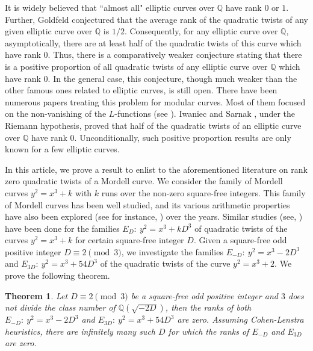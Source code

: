 \documentclass[12pt, 14paper,reqno]{amsart}
\theoremstyle{plain}
\newtheorem{thm}{Theorem}[section]
\theoremstyle{proof}
\numberwithin{equation}{section}
\begin{document}
It is widely believed that ``almost all" elliptic curves over $\mathbb{Q}$ have rank $0$ or $1$. Further, Goldfeld \cite{Go79} conjectured that the average rank of the quadratic twists of any given elliptic curve over $\mathbb{Q}$ is $1/2$.  Consequently, for any elliptic curve over $\mathbb{Q}$, asymptotically, there are at least half of the quadratic twists of this curve which have rank $0$.  Thus, there is a comparatively weaker conjecture stating that there is a positive proportion of all quadratic twists of any elliptic curve over $\mathbb{Q}$ which have rank $0$. In the general case, this conjecture, though much weaker than the other famous ones related to elliptic curves, is still open. There have been numerous papers treating this problem for modular curves. Most of them focused on the non-vanishing of the $L$-functions (see \cite{Ko88, Ko99, OS98, Yu05}). Iwaniec and Sarnak \cite{IS00}, under the Riemann hypothesis, proved that half of the quadratic twists of an elliptic curve over $\mathbb{Q}$ have rank $0$. Unconditionally, such positive proportion results are only known for a few elliptic curves. 

In this article, we prove a result to enlist to the aforementioned literature on rank zero quadratic twists of a Mordell curve. We consider the family of Mordell curves $y^2=x^3+k$ with $k$ runs over the  non-zero square-free integers. This family of Mordell curves has been well studied, and its various arithmetic properties  have also been explored (see for instance, \cite{CH, KI, Qi16}) over the years. Similar studies (see, \cite{MM, ON, WQ}) have been done for the families $E_D:~ y^2=x^3+kD^3$ of quadratic twists of the curves $y^2=x^3+k$ for certain square-free integer $D$. Given a square-free odd positive integer $D\equiv 2\pmod 3$,  we investigate the families $E_{-D}:~ y^2=x^3-2D^3$ and $E_{3D}:~ y^2=x^3+54D^3$ of the quadratic twists of the curve $y^2=x^3+2$. We prove the following theorem. 
\begin{thm}\label{thm}
Let $D\equiv 2\pmod 3$ be a square-free odd positive integer and $3$ does not divide the class number of $\mathbb{Q}(\sqrt{-2D})$, then the ranks of both $E_{-D}:~ y^2=x^3-2D^3$ and $E_{3D}:~ y^2=x^3+54D^3$ are zero. Assuming Cohen-Lenstra heuristics, there are infinitely many such $D$ for which the ranks of $E_{-D}$ and $E_{3D}$ are zero.
\end{thm}   
\end{document}
